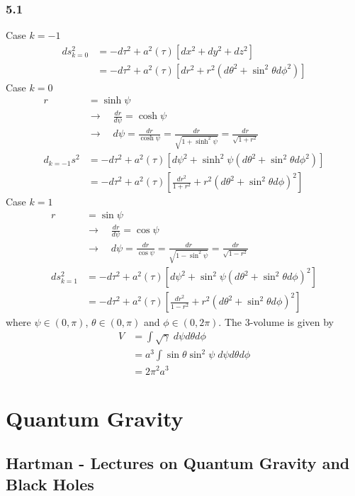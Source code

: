 \documentclass[10pt,a4paper]{book}
\theoremstyle{definition}
\begin{document}
\subsection{5.1}
Case $k=-1$
\begin{align}
ds_{k=0}^2&=-d\tau^2+a^2(\tau)\left[dx^2+dy^2+dz^2\right]\\
 &=-d\tau^2+a^2(\tau)\left[dr^2+r^2(d\theta^2+\sin^2\theta d\phi^2)\right]
\end{align}
Case $k=0$
\begin{align}
r&=\sinh\psi\\
&\rightarrow\quad\frac{dr}{d\psi}=\cosh\psi\\
&\rightarrow\quad d\psi=\frac{dr}{\cosh\psi}=\frac{dr}{\sqrt{1+\sinh^2\psi}}=\frac{dr}{\sqrt{1+r^2}}\\
d_{k=-1}s^2&=-d\tau^2+a^2(\tau)\left[d\psi^2+\sinh^2\psi(d\theta^2+\sin^2\theta d\phi^2)\right]\\
&=-d\tau^2+a^2(\tau)\left[\frac{dr^2}{1+r^2}+r^2(d\theta^2+\sin^2\theta d\phi)^2\right]
\end{align}
Case $k=1$
\begin{align}
r&=\sin\psi\\
&\rightarrow\quad\frac{dr}{d\psi}=\cos\psi\\
&\rightarrow\quad d\psi=\frac{dr}{\cos\psi}=\frac{dr}{\sqrt{1-\sin^2\psi}}=\frac{dr}{\sqrt{1-r^2}}\\
ds_{k=1}^2&=-d\tau^2+a^2(\tau)\left[d\psi^2+\sin^2\psi(d\theta^2+\sin^2\theta d\phi)^2\right]\\
&=-d\tau^2+a^2(\tau)\left[\frac{dr^2}{1-r^2}+r^2(d\theta^2+\sin^2\theta d\phi)^2\right]
\end{align}
where $\psi\in(0,\pi)$, $\theta\in(0,\pi)$ and $\phi\in(0,2\pi)$. The 3-volume is given by
\begin{align}
V&=\int \sqrt{\gamma}\;d\psi d\theta d\phi\\
&=a^3\int \sin\theta\sin^2\psi\; d\psi d\theta d\phi\\
&=2\pi^2 a^3
\end{align}


\newpage
\chapter{Quantum Gravity}
\section{{\sc Hartman} - Lectures on Quantum Gravity and Black Holes}
\end{document}
